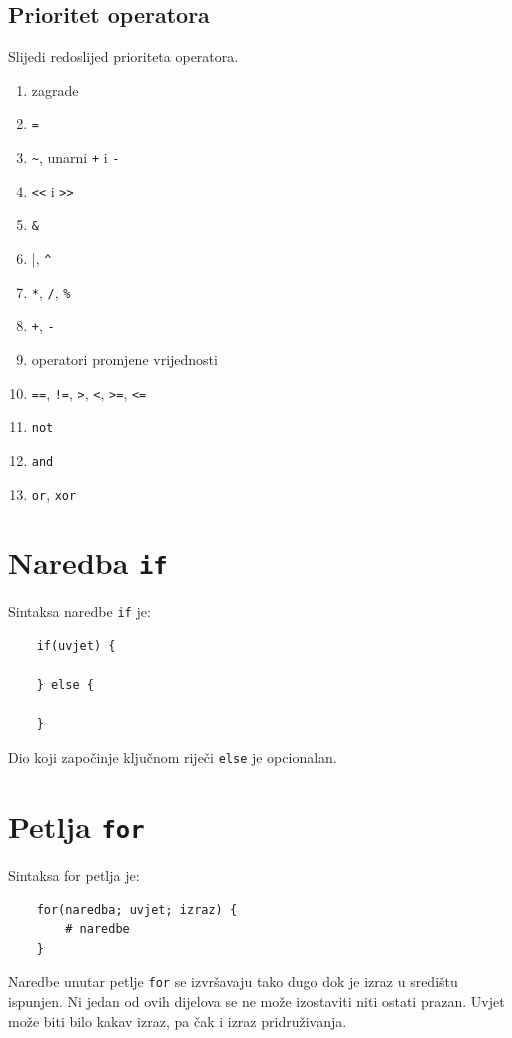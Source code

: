 \documentclass[times, utf8, zavrsni]{fer}
\begin{document}
\subsection{Prioritet operatora}
Slijedi redoslijed prioriteta operatora.

\begin{enumerate} [noitemsep]
    \item zagrade
    \item \verb|=|
    \item \verb|~|, unarni \verb|+| i \verb|-|
    \item \verb|<<| i \verb|>>|
    \item \verb|&|
    \item \verb|||, \verb|^|
    \item \verb|*|, \verb|/|, \verb|%|
    \item \verb|+|, \verb|-|
    \item operatori promjene vrijednosti
    \item \verb|==|, \verb|!=|, \verb|>|, \verb|<|, \verb|>=|, \verb|<=|
    \item \verb|not|
    \item \verb|and|
    \item \verb|or|, \verb|xor|
\end{enumerate}

\section{Naredba \texttt{if}}
Sintaksa naredbe \verb|if| je: 
\begin{verbatim}
    if(uvjet) {

    } else {

    }
\end{verbatim}

Dio koji započinje ključnom riječi \verb|else| je opcionalan.

\section{Petlja \texttt{for}}
Sintaksa for petlja je: 
\begin{verbatim}
    for(naredba; uvjet; izraz) {
        # naredbe
    }
\end{verbatim}
Naredbe unutar petlje \verb|for| se izvršavaju tako dugo dok je izraz u središtu ispunjen. 
Ni jedan od ovih dijelova se ne može izostaviti niti ostati prazan.
Uvjet može biti bilo kakav izraz, pa čak i izraz pridruživanja.
\end{document}
